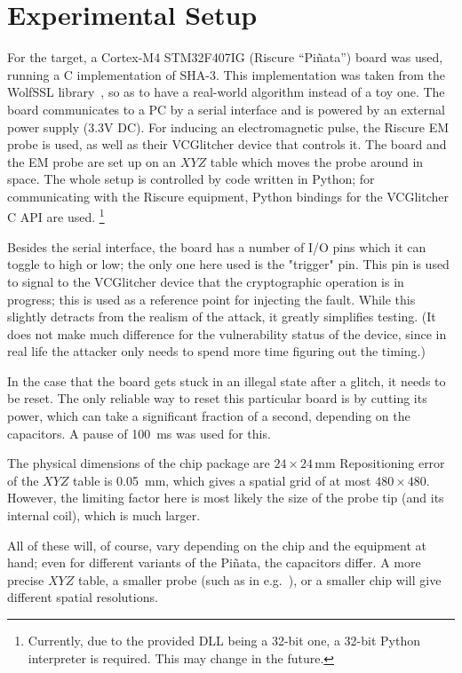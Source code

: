 \documentclass[times, utf8, diplomski]{fer}
\begin{document}
\section{Experimental Setup}\label{sec:setup}
For the target, a Cortex-M4 STM32F407IG (Riscure ``Pi\~{n}ata'') board was used,
running a C implementation of SHA-3. This implementation was taken from the WolfSSL
library~\cite{WolfSSL}, so as to have a real-world algorithm instead of a toy one.
The board communicates to a PC by a serial interface and is powered by an external
power supply (3.3V DC). For inducing an electromagnetic pulse, the Riscure EM probe
is used, as well as their VCGlitcher device that controls it. The board and the EM
probe are set up on an $XYZ$ table which moves the probe around in space.
The whole setup is controlled by code written in Python; for communicating with
the Riscure equipment, Python bindings for the VCGlitcher C API are used.
\footnote{
   Currently, due to the provided DLL being a 32-bit one, a 32-bit Python
   interpreter is required. This may change in the future.
}

Besides the serial interface, the board has a number of I/O pins which it can
toggle to high or low; the only one here used is the "trigger" pin. This pin is
used to signal to the VCGlitcher device that the cryptographic operation is in
progress; this is used as a reference point for injecting the fault. While this
slightly detracts from the realism of the attack, it greatly simplifies testing.
(It does not make much difference for the vulnerability status of the device,
since in real life the attacker only needs to spend more time figuring out the
timing.)

In the case that the board gets stuck in an illegal state after a glitch, it
needs to be reset. The only reliable way to reset this particular board is by
cutting its power, which can take a significant fraction of a second, depending
on the capacitors. A pause of \SI{100}{\milli\second} was used for this.

The physical dimensions of the chip package are $24 \times 24$\,\si{\milli\metre}
Repositioning error of the $XYZ$ table is \SI{0.05}{\milli\metre}, which gives a spatial grid
of at most $480 \times 480$. However, the limiting factor here is most likely
the size of the probe tip (and its internal coil), which is much larger.

All of these will, of course, vary depending on the chip and the equipment at
hand; even for different variants of the Piñata, the capacitors differ.
A more precise $XYZ$ table, a smaller probe (such as in e.g.~\cite{precise_probe_tips}),
or a smaller chip will give different spatial resolutions.
\end{document}
